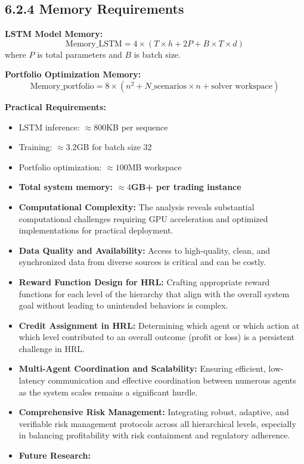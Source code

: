 \documentclass[11pt,a4paper]{article}
\begin{document}
\subsection{6.2.4 Memory Requirements}

\textbf{LSTM Model Memory:}
\begin{equation}
\text{Memory}\_{\text{LSTM}} = 4 \times (T \times h + 2P + B \times T \times d)
\end{equation}
where $P$ is total parameters and $B$ is batch size.

\textbf{Portfolio Optimization Memory:}
\begin{equation}
\text{Memory}\_{\text{portfolio}} = 8 \times (n^2 + N\_{\text{scenarios}} \times n + \text{solver workspace})
\end{equation}

\textbf{Practical Requirements:}
\begin{itemize}
\item LSTM inference: $\approx 800$KB per sequence
\item Training: $\approx 3.2$GB for batch size 32
\item Portfolio optimization: $\approx 100$MB workspace
\item \textbf{Total system memory: $\approx 4$GB+ per trading instance}

\item   \textbf{Computational Complexity:} The analysis reveals substantial computational challenges requiring GPU acceleration and optimized implementations for practical deployment.
\item   \textbf{Data Quality and Availability:} Access to high-quality, clean, and synchronized data from diverse sources is critical and can be costly.
\item   \textbf{Reward Function Design for HRL:} Crafting appropriate reward functions for each level of the hierarchy that align with the overall system goal without leading to unintended behaviors is complex.
\item   \textbf{Credit Assignment in HRL:} Determining which agent or which action at which level contributed to an overall outcome (profit or loss) is a persistent challenge in HRL.
\item   \textbf{Multi-Agent Coordination and Scalability:} Ensuring efficient, low-latency communication and effective coordination between numerous agents as the system scales remains a significant hurdle.
\item   \textbf{Comprehensive Risk Management:} Integrating robust, adaptive, and verifiable risk management protocols across all hierarchical levels, especially in balancing profitability with risk containment and regulatory adherence.
\item   \textbf{Future Research:}
\end{itemize}
\end{document}
